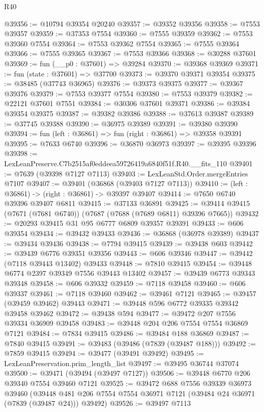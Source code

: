 \begin{lexlean}{R40}
\begin{coremodule}
@39356 := @10794 @39354 @20240
@39357 := @39352 @39356
@39358 := @7553 @39357
@39359 := @37353 @7554
@39360 := @7555 @39359
@39362 := @7553 @39360 @7554
@39364 := @7553 @39362 @7554
@39365 := @7555 @39364
@39366 := @7555 @39365
@39367 := @7553 @39366
@39368 := @30288 @37601
@39369 := fun (__p0 : @37601) => @39284
@39370 := @39368 @39369
@39371 := fun (state : @37601) => @37700
@39373 := @39370 @39371 @39354
@39375 := @38485 (@37743 @36965)
@39376 := @39373 @39375
@39377 := @39367 @39376
@39379 := @7553 @39377 @7554
@39380 := @7553 @39379
@39382 := @22121 @37601 @7551
@39384 := @30306 @37601 @39371
@39386 := @39384 @39354 @39375
@39387 := @39382 @39386
@39388 := @37613 @39387
@39389 := @37745 @39388
@39390 := @36975 @39389
@39391 := @39380 @39390
@39394 := fun (left : @36861) => fun (right : @36861) => @39358 @39391
@39395 := @7633 @6740
@39396 := @36870 @36973
@39397 := @39395 @39396
@39398 := LexLeanPreserve.C7b2515af0eddeea59726419a6840f51f.R40.__fits_110
@39401 := @7639 (@39398 @7127 @7113)
@39403 := LexLeanStd.Order.mergeEntries @7107
@39407 := @39401 (@36868 (@39403 @7127 @7113))
@39410 := (left : @36861) -> (right : @36861) -> @39397 @39407
@39414 := @7650 @6740 @39396 @39407 @6811
@39415 := @37133 @36891
@39425 := @39414 @39415 (@7671 (@7681 @6740)) (@7687 (@7688 (@7689 @6811) @39396 @7665))
@39432 := @20293 @39415 @31 @95 @6777 @6809 @39357 @39391
@39433 := @606 @39354
@39434 := @39432 @39433
@39436 := @36868 (@36978 @39389)
@39437 := @39434 @39436
@39438 := @7794 @39415
@39439 := @39438 @603
@39442 := @39439 @6776 @39351 @39356
@39443 := @606 @39346
@39447 := @39442 (@7118 @39443 @13402) @39433
@39448 := @7810 @39415
@39454 := @39448 @6774 @2397 @39349 @7556 @39443 @13402
@39457 := @39439 @6773 @39343 @39348
@39458 := @606 @39332
@39459 := @7118 @39458
@39460 := @606 @39337
@39461 := @7118 @39460
@39462 := @39461 @7121
@39465 := @39457 (@39459 @39462) @39443
@39471 := @39448 @596 @6772 @39335 @39342 @39458 @39462
@39472 := @39438 @594
@39477 := @39472 @207 @7556 @39334 @36909 @39458
@39483 := @39448 @204 @206 @7554 @7554 @36869 @7121
@39484 := @7834 @39415
@39486 := @39484 @188 @36869
@39487 := @7840 @39415
@39491 := @39483 (@39486 (@7839 (@39487 @188)))
@39492 := @7859 @39415
@39494 := @39477 (@39491 @39492)
@39495 := LexLeanPreservation.prim_length_list
@39497 := @39495 @36744 @37074
@39500 := @39471 (@39494 (@39497 @7127))
@39506 := @39448 @6770 @206 @39340 @7554 @39460 @7121
@39525 := @39472
    @688
    @7556
    @39339
    @36973
    @39460
    (@39448 @481 @206 @7554 @7554 @36971 @7121 (@39484 @24 @36971 (@7839 (@39487 @24))) @39492)
@39526 := @39497 @7113

\end{coremodule}
\end{lexlean}
